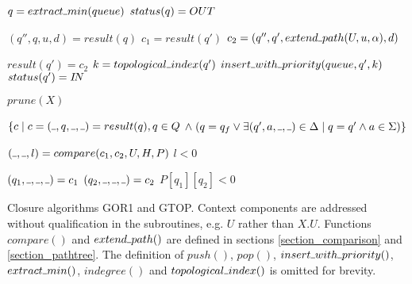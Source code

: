 \documentclass[AMA,STIX1COL]{WileyNJD-v2}
\newcommand{\Xund}{\rule{.4em}{.4pt}}
\begin{document}
\begin{algorithm}[]
\begin{multicols}{2}
{{            $q = extract \Xund min(queue)$ \;
            $status(q) = OUT$ \;

            \BlankLine
             {
                $(q'', q, u, d) = result(q)$ \;
                $c_1 = result(q')$ \;
                $c_2 = (q'', q', extend \Xund path (U, u, \alpha), d)$ \;

                \BlankLine
                 {
                    $result(q') = c_2$ \;
                     {
                        $k = topological \Xund index(q')$ \;
                        $insert \Xund with \Xund priority(queue, q', k)$ \;
                        $status(q') = I\!N$ \;
                    }
                }
            }
        }

        \BlankLine
        \Return $prune(X)$
    }
    \BlankLine
    \BlankLine

     {
        \Return $\{ c \mid c = (\Xund, q, \Xund, \Xund) = result(q), q \in Q$ \;
        \Indp\Indp
        $\wedge \; (q = q_f \vee \exists (q', a, \Xund, \Xund) \in \Delta \mid q = q' \wedge a \in \Sigma) \}$ \;
        \Indm\Indm
    }
    \BlankLine
    \BlankLine

     {
        $(\Xund, \Xund, l) = compare (c_1, c_2, U, H, P)$ \;
        \Return $l < 0$
    }
    \BlankLine
    \BlankLine

     {
        $(q_1, \Xund, \Xund, \Xund) = c_1$ \;
        $(q_2, \Xund, \Xund, \Xund) = c_2$ \;
        \Return $P[q_1][q_2] < 0$
    }
    \BlankLine
    \BlankLine

\end{multicols}
\vspace{1em}
\caption{
Closure algorithms GOR1 and GTOP.
Context components are addressed without qualification in the subroutines, e.g. $U$ rather than $X.U$.
Functions $compare ()$ and $extend \Xund path ()$ are defined in sections \ref{section_comparison} and \ref{section_pathtree}.
The definition of $push()$, $pop()$, $insert \Xund with \Xund priority()$, $extract \Xund min()$,
$indegree()$ and $topological \Xund index()$ is omitted for brevity.
}
\end{algorithm}
\end{document}
